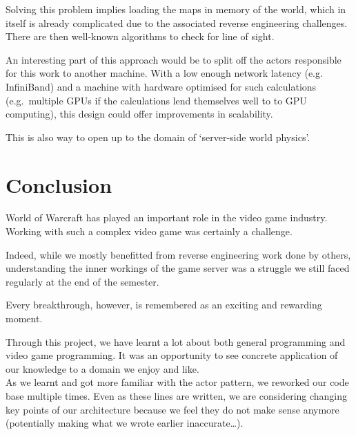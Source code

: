 \documentclass[paper=a4, fontsize=11pt]{scrartcl}
\begin{document}
Solving this problem implies loading the maps in memory of the world, which in
itself is already complicated due to the associated reverse engineering
challenges.
There are then well-known algorithms to check for line of sight.

An interesting part of this approach would be to split off the actors
responsible for this work to another machine. With a low enough network latency
(e.g. InfiniBand) and a machine with hardware optimised for such
calculations (e.g.\ multiple GPUs if the calculations lend themselves well to
to GPU computing), this design could offer improvements in scalability.

This is also way to open up to the domain of `server-side world physics'.

\section{Conclusion}


World of Warcraft has played an important role in the video game industry.
Working with such a complex video game was certainly a challenge.

Indeed, while we mostly benefitted from reverse engineering work done by others,
understanding the inner workings of the game server was a struggle we still
faced regularly at the end of the semester.

Every breakthrough, however, is remembered as an exciting and rewarding
moment.

Through this project, we have learnt a lot about both general programming and
video game programming.
It was an opportunity to see concrete application of our knowledge to a domain
we enjoy and like.\\

As we learnt and got more familiar with the actor pattern, we reworked our code
base multiple times.
Even as these lines are written, we are considering changing key points of our
architecture because we feel they do not make sense anymore (potentially making
what we wrote earlier inaccurate\ldots).
\end{document}
